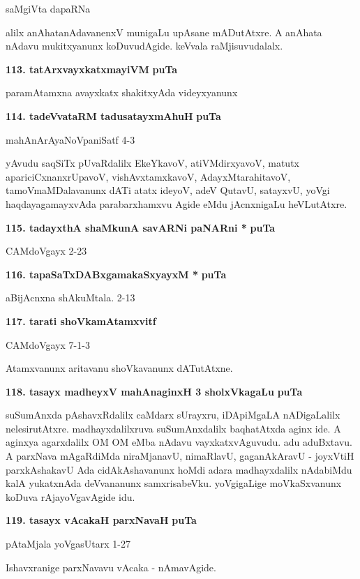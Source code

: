 \hfill{saMgiVta dapaRNa}

\smallskip
alilx anAhatanAdavanenxV munigaLu upAsane mADutAtxre. A anAhata nAdavu mukitxyanunx koDuvu\-dAgide. keVvala raMjisuvudalalx.

\medskip
\noindent
\textbf{113. tatArxvayxkatxmayiVM} \hfill{\bf puTa \pageref{86}}

\smallskip
paramAtamxna avayxkatx shakitxyAda videyxyanunx

\medskip
\noindent
\textbf{114. tadeVvataRM tadusatayxmAhuH} \hfill{\bf puTa \pageref{239}}

\hfill{mahAnArAyaNoVpaniSatf 4-3}

\smallskip
yAvudu saqSiTx pUvaRdalilx EkeYkavoV, atiVMdirxyavoV, matutx apari\-ciCxnanxrUpavoV, vishAvxtamxkavoV, AdayxMtarahitavoV, tamoVmaMDalavanunx dATi atatx ideyoV, adeV QutavU, satayxvU, yoVgi haqdaya\-gamayxvAda parabarxhamxvu Agide eMdu jAcnxnigaLu heVLutAtxre.


\medskip
\noindent
\textbf{115. tadayxthA shaMkunA savARNi paNARni *} \hfill{\bf puTa \pageref{84}}

\hfill{CAMdoVgayx 2-23}

\medskip
\noindent
\textbf{116. tapaSaTxDABxgamakaSxyayxM *} \hfill{\bf puTa \pageref{86}}

\hfill{aBijAcnxna shAkuMtala. 2-13}

\medskip
\noindent
\textbf{117. tarati shoVkamAtamxvitf} \hfill{\bf \pageref{42}}

\hfill{CAMdoVgayx 7-1-3}

Atamxvanunx aritavanu shoVkavanunx dATutAtxne.

\medskip
\noindent
\textbf{118. tasayx madheyxV mahAnaginxH 3 sholxVkagaLu} \hfill{\bf puTa \pageref{150}}

\smallskip
suSumAnxda pAshavxRdalilx caMdarx sUrayxru, iDApiMgaLA nADigaLalilx nelesiru\-tAtxre. madhayxdalilxruva suSumAnxdalilx  baqhatAtxda aginx ide. A aginxya agarxdalilx OM OM eMba nAdavu vayxkatxvAguvudu. adu aduBxtavu. A parxNava mAgaRdiMda niraMjanavU, nimaRlavU, gaganAkAravU - joyxVtiH parxkAshakavU Ada cidAkAshavanunx hoMdi adara madhayxdalilx nAdabiMdu kalA yukatxnAda deVvananunx samxrisabeVku. yoVgi\-gaLige moVkaSxvanunx koDuva rAjayoVgavAgide idu.

\medskip
\noindent
\textbf{119. tasayx vAcakaH parxNavaH} \hfill{\bf puTa \pageref{147}}

\hfill{pAtaMjala yoVgasUtarx 1-27}

Ishavxranige parxNavavu vAcaka - nAmavAgide.

